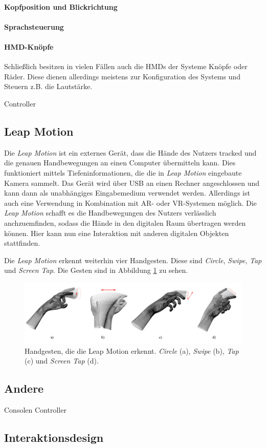 \paragraph{Kopfposition und Blickrichtung}

\paragraph{Sprachsteuerung}
\paragraph{HMD-Knöpfe}
Schließlich besitzen in vielen Fällen auch die HMDs der Systeme Knöpfe oder Räder. Diese dienen allerdings meistens zur Konfiguration des Systems und Steuern z.B. die Lautstärke.

Controller
\subsection{Leap Motion}

Die \textit{Leap Motion} ist ein externes Gerät, dass die Hände des Nutzers tracked und die genauen Handbewegungen an einen Computer übermitteln kann. 
Dies funktioniert mittels Tiefeninformationen, die die in \textit{Leap Motion} eingebaute Kamera sammelt. Das Gerät wird über USB an einen Rechner angeschlossen und kann dann als unabhängiges Eingabemedium verwendet werden. Allerdings ist auch eine Verwendung in Kombination mit AR- oder VR-Systemen möglich. 
Die \textit{Leap Motion} schafft es die Handbewegungen des Nutzers verlässlich anchzuemfinden, sodass die Hände in den digitalen Raum übertragen werden können. Hier kann nun eine Interaktion mit anderen digitalen Objekten stattfinden. 

Die \textit{Leap Motion} erkennt weiterhin vier Handgesten. Diese sind \textit{Circle}, \textit{Swipe}, \textit{Tap} und \textit{Screen Tap}. Die Gesten sind in Abbildung \ref{img:motionGestures} zu sehen. 

\begin{figure}
	\centering
	\includegraphics[width=0.7\linewidth]{images/motionGesture.pdf}
	\caption{Handgesten, die die Leap Motion erkennt. \textit{Circle} (a), \textit{Swipe} (b), \textit{Tap} (c) und \textit{Screen Tap} (d).}
	\label{img:motionGestures}
\end{figure}


\subsection{Andere}
Consolen Controller
\subsection{Interaktionsdesign}







